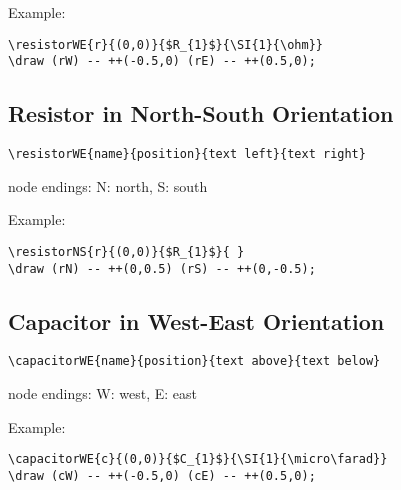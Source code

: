 \documentclass[parskip=full]{scrartcl}
\begin{document}
Example:\\
\begin{minipage}{0.8\textwidth}
\begin{verbatim}
\resistorWE{r}{(0,0)}{$R_{1}$}{\SI{1}{\ohm}}
\draw (rW) -- ++(-0.5,0) (rE) -- ++(0.5,0);
\end{verbatim}
\end{minipage}
\begin{minipage}{0.19\textwidth}
\end{minipage}

\subsection{Resistor in North-South Orientation}

\begin{verbatim}
\resistorWE{name}{position}{text left}{text right}
\end{verbatim}
node endings: N: north, S: south

Example:\\
\begin{minipage}{0.8\textwidth}
\begin{verbatim}
\resistorNS{r}{(0,0)}{$R_{1}$}{ }
\draw (rN) -- ++(0,0.5) (rS) -- ++(0,-0.5);
\end{verbatim}
\end{minipage}
\begin{minipage}{0.19\textwidth}
\end{minipage}

\subsection{Capacitor in West-East Orientation}

\begin{verbatim}
\capacitorWE{name}{position}{text above}{text below}
\end{verbatim}
node endings: W: west, E: east

Example:\\
\begin{minipage}{0.8\textwidth}
\begin{verbatim}
\capacitorWE{c}{(0,0)}{$C_{1}$}{\SI{1}{\micro\farad}}
\draw (cW) -- ++(-0.5,0) (cE) -- ++(0.5,0);
\end{verbatim}
\end{minipage}
\begin{minipage}{0.19\textwidth}
\end{minipage}
\end{document}
